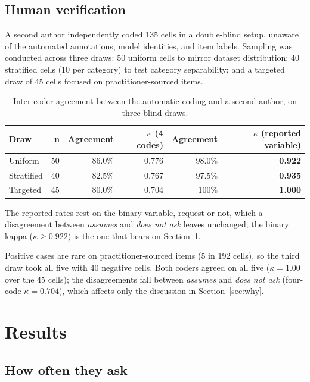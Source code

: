 \documentclass{IOS-Book-Article}
\begin{document}
\subsection{Human verification}
\label{sec:verification}

A second author independently coded 135 cells in a double-blind setup, unaware of the automated annotations, model identities, and item labels. Sampling was conducted across three draws: 50 uniform cells to mirror dataset distribution; 40 stratified cells (10 per category) to test category separability; and a targeted draw of 45 cells focused on practitioner-sourced items.

\begin{table}[H]
\centering
\caption{Inter-coder agreement between the automatic coding and a second author, on three blind draws.}
\label{tab:kappa}
\footnotesize
\begin{tabular}{@{}lrrrrr@{}}
\toprule
Draw & n & Agreement & $\kappa$ (4 codes) & Agreement & $\kappa$ (reported variable) \\
\midrule
Uniform & 50 & 86.0\% & 0.776 & 98.0\% & \textbf{0.922} \\
Stratified & 40 & 82.5\% & 0.767 & 97.5\% & \textbf{0.935} \\
Targeted & 45 & 80.0\% & 0.704 & 100\% & \textbf{1.000} \\
\bottomrule
\end{tabular}
\end{table}

The reported rates rest on the binary variable, request or not, which a disagreement between \emph{assumes} and \emph{does not ask} leaves unchanged; the binary kappa ($\kappa \ge 0.922$) is the one that bears on Section~\ref{sec:results}.

Positive cases are rare on practitioner-sourced items (5 in 192 cells), so the third draw took all five with 40 negative cells. Both coders agreed on all five ($\kappa = 1.00$ over the 45 cells); the disagreements fall between \emph{assumes} and \emph{does not ask} (four-code $\kappa = 0.704$), which affects only the discussion in Section~\ref{sec:why}.

\section{Results}\label{sec:results}

\subsection{How often they ask}
\end{document}
